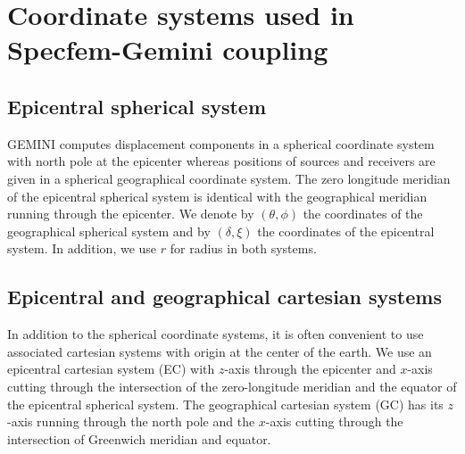 \documentclass[12pt,a4paper]{article}
\begin{document}
\setlength{\parindent}{0cm}
\addtolength{\parskip}{0.1cm}
\section{Coordinate systems used in Specfem-Gemini coupling}
\subsection{Epicentral spherical system}
GEMINI computes displacement components in a spherical coordinate system with north pole at the epicenter whereas positions of sources and receivers are given in a spherical geographical coordinate system. The zero longitude meridian of the epicentral spherical system is identical with the geographical meridian running through the epicenter. We denote by $(\theta,\phi)$ the coordinates of the geographical spherical system and by $(\delta,\xi)$ the coordinates of the epicentral system. In addition, we use $r$ for radius in both systems.
%
\subsection{Epicentral and geographical cartesian systems}
In addition to the spherical coordinate systems, it is often convenient to use associated cartesian systems with origin at the center of the earth. We use an epicentral cartesian system (EC) with $z$-axis through the epicenter and $x$-axis cutting through the intersection of the zero-longitude meridian and the equator of the epicentral spherical system. The geographical cartesian system (GC) has its $z$-axis running through the north pole and the $x$-axis cutting through the intersection of Greenwich meridian and equator.
%
\end{document}
